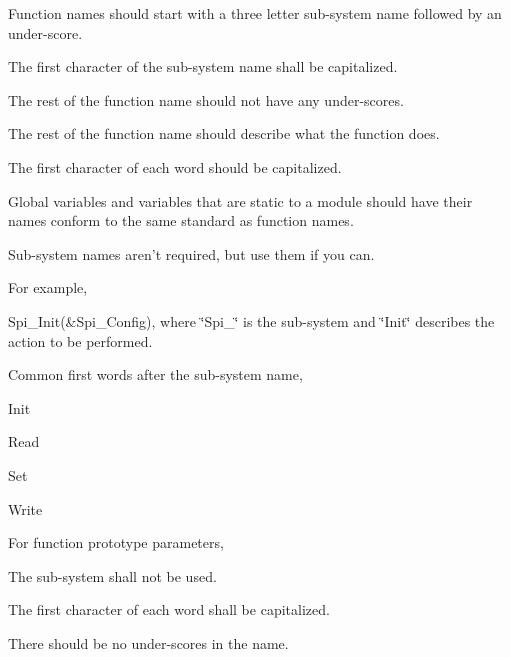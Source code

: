 \begin{DoxyItemize}
\item Function names should start with a three letter sub-\/system name followed by an under-\/score. \par

\item The first character of the sub-\/system name shall be capitalized. \par

\item The rest of the function name should not have any under-\/scores. \par

\item The rest of the function name should describe what the function does.\par

\item The first character of each word should be capitalized. \par

\item Global variables and variables that are static to a module should have their names conform to the same standard as function names. \par

\item Sub-\/system names aren't required, but use them if you can.\par
\par

\end{DoxyItemize}

For example,
\begin{DoxyItemize}
\item Spi\-\_\-\-Init(\&\-Spi\-\_\-\-Config), where \char`\"{}\-Spi\-\_\-\char`\"{} is the sub-\/system and \char`\"{}\-Init\char`\"{} describes the action to be performed.\par
\par

\end{DoxyItemize}

Common first words after the sub-\/system name,
\begin{DoxyItemize}
\item Init
\item Read
\item Set
\item Write
\end{DoxyItemize}

For function prototype parameters,
\begin{DoxyItemize}
\item The sub-\/system shall not be used.
\item The first character of each word shall be capitalized.
\item There should be no under-\/scores in the name.
\end{DoxyItemize}

